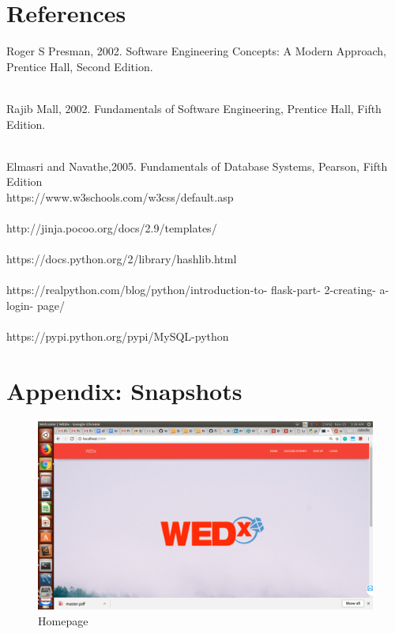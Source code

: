 \documentclass[12pt]{report}
\begin{document}
\chapter{References} 


\noindent [1] Roger S Presman, 2002. Software Engineering Concepts: A Modern Approach, Prentice Hall, Second Edition. \\\

\noindent [2] Rajib Mall, 2002. Fundamentals of Software Engineering, Prentice Hall, Fifth Edition. \\\

\noindent [3] Elmasri and Navathe,2005. Fundamentals of Database Systems, Pearson, Fifth Edition \\



\noindent [4] https://www.w3schools.com/w3css/default.asp \\\\
\noindent [5] http://jinja.pocoo.org/docs/2.9/templates/\\\\
\noindent [6] https://docs.python.org/2/library/hashlib.html \\\\
\noindent [7] https://realpython.com/blog/python/introduction-to- flask-part- 2-creating- a-login-
page/ \\\\
\noindent [8] https://pypi.python.org/pypi/MySQL-python


\chapter{Appendix: Snapshots} 

\begin{figure}[!htb]
    \centering
    \includegraphics[width=1\textwidth]{sc-1.png}
    \caption{Homepage}
    \label{fig:Homepage}
\end{figure}
\end{document}
